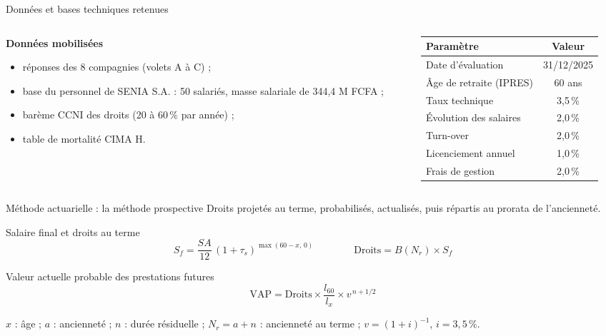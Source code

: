 \documentclass[aspectratio=169,11pt]{beamer}
\begin{document}
\begin{frame}{Données et bases techniques retenues}
  \vspace{0.2cm}
  \begin{columns}[T]
    \begin{column}{0.46\textwidth}
      \textcolor{orangeC}{\textbf{Données mobilisées}}
      \begin{itemize}\itemsep0.15cm
        \item réponses des 8 compagnies (volets A à C) ;
        \item base du personnel de SENIA S.A. : 50 salariés, masse salariale
              de 344,4 M FCFA ;
        \item barème CCNI des droits (20 à 60\,\% par année) ;
        \item table de mortalité CIMA H.
      \end{itemize}
    \end{column}
    \begin{column}{0.50\textwidth}
      \small
      \begin{tabular}{lc}
        \toprule
        \rowcolor{orangeM} Paramètre & Valeur \\
        \midrule
        Date d'évaluation & 31/12/2025 \\
        Âge de retraite (IPRES) & 60 ans \\
        Taux technique & 3,5\,\% \\
        Évolution des salaires & 2,0\,\% \\
        Turn-over & 2,0\,\% \\
        Licenciement annuel & 1,0\,\% \\
        Frais de gestion & 2,0\,\% \\
        \bottomrule
      \end{tabular}
    \end{column}
  \end{columns}
\end{frame}

\begin{frame}{Méthode actuarielle : la méthode prospective}
  \vspace{0.2cm}
  Droits projetés au terme, probabilisés, actualisés, puis répartis au prorata
  de l'ancienneté.
  \vspace{0.25cm}
  \begin{block}{Salaire final et droits au terme}
    \vspace{-0.25cm}
    $$ S_f = \frac{SA}{12}\,(1+\tau_s)^{\max(60-x,\,0)}
       \qquad\qquad \text{Droits} = B(N_r)\times S_f $$
  \end{block}
  \begin{block}{Valeur actuelle probable des prestations futures}
    \vspace{-0.25cm}
    $$ \mathrm{VAP} = \text{Droits}\times\frac{l_{60}}{l_x}\times v^{\,n+1/2} $$
  \end{block}
  \small $x$ : âge ; $a$ : ancienneté ; $n$ : durée résiduelle ;
  $N_r = a + n$ : ancienneté au terme ; $v=(1+i)^{-1}$, $i=3{,}5\,\%$.
\end{frame}
\end{document}
